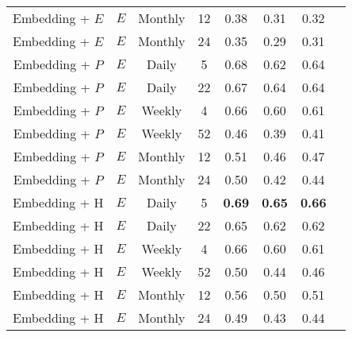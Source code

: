 \documentclass[runningheads]{llncs}
\begin{document}
\begin{table}[!tb]
\begin{tabular}{cccccccc}
        Embedding + $E$ & $E$ & Monthly & 12 & 0.38 & 0.31 & 0.32  \\
        Embedding + $E$ & $E$ & Monthly & 24 & 0.35 & 0.29 & 0.31  \\
        \midrule
        Embedding + $P$ & $E$ & Daily & 5 & 0.68 & 0.62 & 0.64   \\
        Embedding + $P$ & $E$ & Daily & 22 & 0.67 & 0.64 & 0.64  \\
        Embedding + $P$ & $E$ & Weekly & 4 & 0.66 & 0.60 & 0.61  \\
        Embedding + $P$ & $E$ & Weekly & 52 & 0.46 & 0.39 & 0.41  \\
        Embedding + $P$ & $E$ & Monthly & 12 & 0.51 & 0.46 & 0.47  \\
        Embedding + $P$ & $E$ & Monthly & 24 & 0.50 & 0.42 & 0.44  \\
        \midrule
        Embedding + H & $E$ & Daily & 5 & \textbf{0.69} & \textbf{0.65} & \textbf{0.66}   \\
        Embedding + H & $E$ & Daily & 22 & 0.65 & 0.62 & 0.62  \\
        Embedding + H & $E$ & Weekly & 4 & 0.66 & 0.60 & 0.61  \\
        Embedding + H & $E$ & Weekly & 52 & 0.50 & 0.44 & 0.46  \\
        Embedding + H & $E$ & Monthly & 12 & 0.56 & 0.50 & 0.51  \\
        Embedding + H & $E$ & Monthly & 24 & 0.49 & 0.43 & 0.44  \\
        \bottomrule
    \end{tabular}
\end{table}
\end{document}
